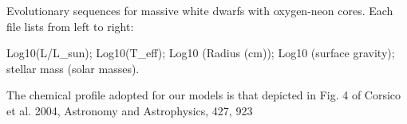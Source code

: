 

Evolutionary sequences for massive white dwarfs with oxygen-neon cores.
Each file lists from left to right: 

Log10(L/L_sun); Log10(T_eff); Log10 (Radius (cm)); Log10 (surface gravity);
 stellar mass (solar masses).


The chemical profile adopted for our models is that depicted in Fig. 4
of Corsico et al. 2004, Astronomy and Astrophysics, 427, 923
 
